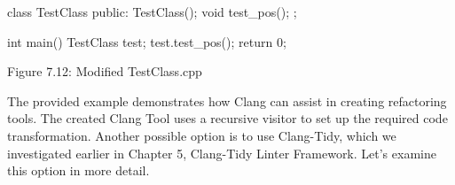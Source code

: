 \begin{cpp}
class TestClass {
public:
  TestClass(){};
  void test_pos(){};
};

int main() {
  TestClass test;
  test.test_pos();
  return 0;
}
\end{cpp}

\begin{center}
Figure 7.12: Modified TestClass.cpp
\end{center}

The provided example demonstrates how Clang can assist in creating refactoring tools. The created Clang Tool uses a recursive visitor to set up the required code transformation. Another possible option is to use Clang-Tidy, which we investigated earlier in Chapter 5, Clang-Tidy Linter Framework. Let’s examine this option in more detail.




















































